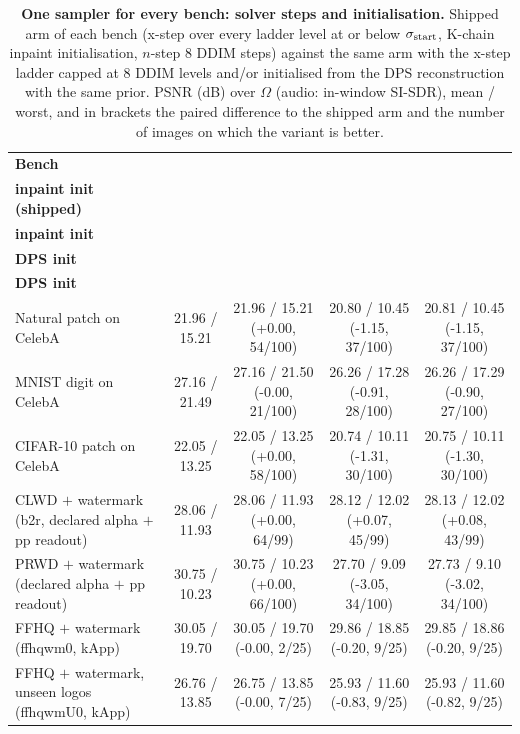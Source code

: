 \begin{table}[t]
    \centering
    \caption{\textbf{One sampler for every bench: solver steps and initialisation.} Shipped \methodmin{} arm of each bench (x-step over every ladder level at or below $\sigma_{\rm start}$, K-chain inpaint initialisation, $n$-step 8 DDIM steps) against the same arm with the x-step ladder capped at 8 DDIM levels and/or initialised from the DPS reconstruction with the same prior. PSNR (dB) over $\Omega$ (audio: in-window SI-SDR), mean / worst, and in brackets the paired difference to the shipped arm and the number of images on which the variant is better.}
    \label{tab:consistency}
    \small
    \setlength{\tabcolsep}{3pt}
    \begin{tabular}{@{}lcccc@{}}
        \toprule
        \textbf{Bench} & \shortstack{\textbf{all levels}\\\textbf{inpaint init (shipped)}} & \shortstack{\textbf{8 levels}\\\textbf{inpaint init}} & \shortstack{\textbf{all levels}\\\textbf{DPS init}} & \shortstack{\textbf{8 levels}\\\textbf{DPS init}} \\
        \midrule
        Natural patch on CelebA & 21.96 / 15.21 & 21.96 / 15.21 (+0.00, 54/100) & 20.80 / 10.45 (-1.15, 37/100) & 20.81 / 10.45 (-1.15, 37/100) \\
        MNIST digit on CelebA & 27.16 / 21.49 & 27.16 / 21.50 (-0.00, 21/100) & 26.26 / 17.28 (-0.91, 28/100) & 26.26 / 17.29 (-0.90, 27/100) \\
        CIFAR-10 patch on CelebA & 22.05 / 13.25 & 22.05 / 13.25 (+0.00, 58/100) & 20.74 / 10.11 (-1.31, 30/100) & 20.75 / 10.11 (-1.30, 30/100) \\
        CLWD $+$ watermark (b2r, declared alpha $+$ pp readout) & 28.06 / 11.93 & 28.06 / 11.93 (+0.00, 64/99) & 28.12 / 12.02 (+0.07, 45/99) & 28.13 / 12.02 (+0.08, 43/99) \\
        PRWD $+$ watermark (declared alpha $+$ pp readout) & 30.75 / 10.23 & 30.75 / 10.23 (+0.00, 66/100) & 27.70 / 9.09 (-3.05, 34/100) & 27.73 / 9.10 (-3.02, 34/100) \\
        FFHQ $+$ watermark (ffhqwm0, kApp) & 30.05 / 19.70 & 30.05 / 19.70 (-0.00, 2/25) & 29.86 / 18.85 (-0.20, 9/25) & 29.85 / 18.86 (-0.20, 9/25) \\
        FFHQ $+$ watermark, unseen logos (ffhqwmU0, kApp) & 26.76 / 13.85 & 26.75 / 13.85 (-0.00, 7/25) & 25.93 / 11.60 (-0.83, 9/25) & 25.93 / 11.60 (-0.82, 9/25) \\

\end{tabular}
\end{table}
